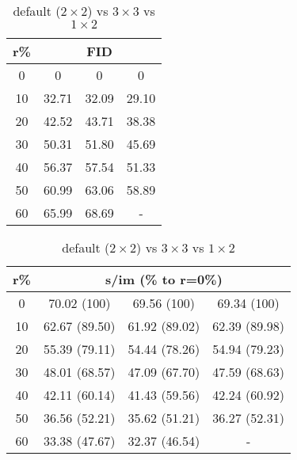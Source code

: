 \begin{table}[htp]
\caption{default ($2 \times 2$) vs $3 \times 3$ vs $1 \times 2$}
\label{table:exp_3}
    \begin{minipage}{0.4\textwidth}
        \begin{tabular}{|c||c|c|c|}
            \hline
            \multicolumn{1}{|c||}{r\%} & \multicolumn{3}{c|}{FID}\\
            \hline
            0 & 0 & 0 & 0 \\
            10 & 32.71 & 32.09 & 29.10 \\
            20 & 42.52 & 43.71 & 38.38 \\
            30 & 50.31 & 51.80 & 45.69 \\
            40 & 56.37 & 57.54 & 51.33 \\
            50 & 60.99 & 63.06 & 58.89 \\
            60 & 65.99 & 68.69 & - \\
            \hline
        \end{tabular}
    \end{minipage}
    \begin{minipage}{0.4\textwidth}
        \begin{tabular}{|c||c|c|c|}
            \hline
            \multicolumn{1}{|c||}{r\%} & \multicolumn{3}{c|}{s/im (\% to r=0\%)}\\
            \hline
            0 & 70.02 (100) & 69.56 (100) & 69.34 (100) \\
            10 & 62.67 (89.50) & 61.92 (89.02) & 62.39 (89.98) \\
            20 & 55.39 (79.11) & 54.44 (78.26) & 54.94 (79.23) \\
            30 & 48.01 (68.57) & 47.09 (67.70) & 47.59 (68.63) \\
            40 & 42.11 (60.14) & 41.43 (59.56) & 42.24 (60.92) \\
            50 & 36.56 (52.21) & 35.62 (51.21) & 36.27 (52.31) \\
            60 & 33.38 (47.67) & 32.37 (46.54) & - \\
            \hline
        \end{tabular}
    \end{minipage}
\end{table}